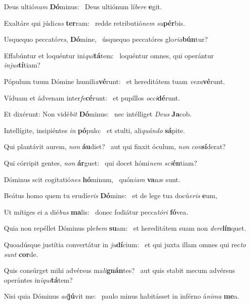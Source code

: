 \item Deus ultió\textit{num} \textbf{Dó}minus:~\psstar{} Deus ultiónum lí\textit{bere} \textbf{e}git.
\item Exaltáre qui júdi\textit{cas} \textbf{ter}ram:~\psstar{} redde retributió\textit{nem} \textit{su}\textbf{pér}bis.
\item Usquequo peccató\textit{res}, \textbf{Dó}mine,~\psstar{} úsquequo peccatóres glo\textit{ria}\textbf{bún}tur?
\item Effabúntur et loquéntur ini\textit{qui}\textbf{tá}tem:~\psstar{} loquéntur omnes, qui operántur \textit{injus}\textbf{tí}tiam?
\item Pópulum tuum Dómine humili\textit{a}\textbf{vé}runt:~\psstar{} et hereditátem tuam \textit{vexa}\textbf{vé}runt.
\item Víduam et ádvenam inter\textit{fe}\-\textbf{cé}runt:~\psstar{} et pupíllos \textit{occi}\textbf{dé}runt.
\item Et dixérunt: Non vidé\textit{bit} \textbf{Dó}minus:~\psstar{} nec intélliget \textit{Deus} \textbf{Ja}cob.
\item Intellígite, insipiéntes \textit{in} \textbf{pó}pulo:~\psstar{} et stulti, ali\textit{quándo} \textbf{sá}pite.
\item Qui plantávit aurem, \textit{non} \textbf{áu}diet?~\psstar{} aut qui finxit óculum, \textit{non} \textit{con}\textbf{sí}derat?
\item Qui córripit gentes, \textit{non} \textbf{ár}guet:~\psstar{} qui docet hómi\textit{nem} \textit{sci}\textbf{én}tiam?
\item Dóminus scit cogitatió\textit{nes} \textbf{hó}minum,~\psstar{} quón\textit{iam} \textbf{va}næ sunt.
\item Beátus homo quem tu erudíe\textit{ris} \textbf{Dó}mine:~\psstar{} et de lege tua docú\textit{eris} \textbf{e}um,
\item Ut mítiges ei a dié\textit{bus} \textbf{ma}lis:~\psstar{} donec fodiátur pecca\textit{tóri} \textbf{fó}vea.
\item Quia non repéllet Dóminus ple\textit{bem} \textbf{su}am:~\psstar{} et hereditátem suam non \textit{dere}\textbf{lín}quet.
\item Quoadúsque justítia convertátur in \textit{ju}\textbf{dí}cium:~\psstar{} et qui juxta illam omnes qui rec\textit{to} \textit{sunt} \textbf{cor}de.
\item Quis consúrget mihi advérsus ma\textit{li}\textbf{gnán}tes?~\psstar{} aut quis stabit mecum advérsus operántes in\textit{iqui}\textbf{tá}tem?
\item Nisi quia Dóminus \textit{ad}\textbf{jú}vit me:~\psstar{} paulo minus habitásset in inférno á\textit{nima} \textbf{me}a.
